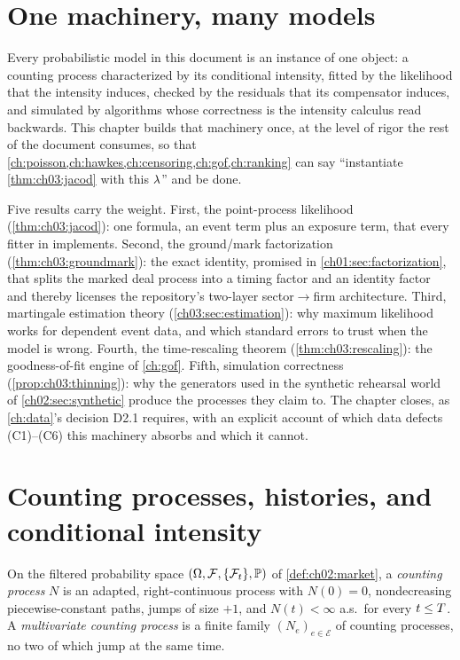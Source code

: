 
\section{One machinery, many models}\label{ch03:sec:overview}

Every probabilistic model in this document is an instance of one object: a
counting process characterized by its conditional intensity, fitted by the
likelihood that the intensity induces, checked by the residuals that its
compensator induces, and simulated by algorithms whose correctness is the
intensity calculus read backwards. This chapter builds that machinery once,
at the level of rigor the rest of the document consumes, so that
\cref{ch:poisson,ch:hawkes,ch:censoring,ch:gof,ch:ranking} can say
``instantiate \cref{thm:ch03:jacod} with this $\lambda$'' and be done.

Five results carry the weight. First, the point-process likelihood
(\cref{thm:ch03:jacod}): one formula, an event term plus an exposure term,
that every fitter in \modrepo{} implements. Second, the ground/mark
factorization (\cref{thm:ch03:groundmark}): the exact identity, promised in
\cref{ch01:sec:factorization}, that splits the marked deal process into a
timing factor and an identity factor and thereby licenses the repository's
two-layer sector$\to$firm architecture. Third, martingale estimation theory
(\cref{ch03:sec:estimation}): why maximum likelihood works for dependent
event data, and which standard errors to trust when the model is wrong.
Fourth, the time-rescaling theorem (\cref{thm:ch03:rescaling}): the
goodness-of-fit engine of \cref{ch:gof}. Fifth, simulation correctness
(\cref{prop:ch03:thinning}): why the generators used in the synthetic
rehearsal world of \cref{ch02:sec:synthetic} produce the processes they
claim to. The chapter closes, as \cref{ch:data}'s decision D2.1 requires,
with an explicit account of which data defects (C1)--(C6) this machinery
absorbs and which it cannot.

\section{Counting processes, histories, and conditional intensity}\label{ch03:sec:counting}

\begin{definition}\label{def:ch03:counting}
On the filtered probability space $(\Omega,\mathcal{F},\{\mathcal{F}_{t}\},\mathbb{P})$ of
\cref{def:ch02:market}, a \emph{counting process} $N$ is an adapted,
right-continuous process with $N(0)=0$, nondecreasing piecewise-constant
paths, jumps of size $+1$, and $N(t)<\infty$ a.s.\ for every $t \le T$.
A \emph{multivariate counting process} is a finite family
$(N_e)_{e \in \mathcal{E}}$ of counting processes, no two of which jump at
the same time.
\end{definition}


